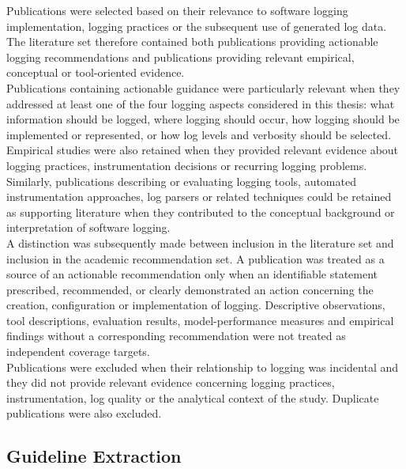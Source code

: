 Publications were selected based on their relevance to software logging
implementation, logging practices or the subsequent use of generated log data.
The literature set therefore contained both publications providing actionable
logging recommendations and publications providing relevant empirical, conceptual
or tool-oriented evidence.
\\
Publications containing actionable guidance were particularly relevant when they
addressed at least one of the four logging aspects considered in this thesis:
what information should be logged, where logging should occur, how logging should
be implemented or represented, or how log levels and verbosity should be selected.
\\
Empirical studies were also retained when they provided relevant evidence about
logging practices, instrumentation decisions or recurring logging problems.
Similarly, publications describing or evaluating logging tools, automated
instrumentation approaches, log parsers or related techniques could be retained as
supporting literature when they contributed to the conceptual background or
interpretation of software logging.
\\
A distinction was subsequently made between inclusion in the literature set and
inclusion in the academic recommendation set. A publication was treated as a source
of an actionable recommendation only when an identifiable statement prescribed,
recommended, or clearly demonstrated an action concerning the creation,
configuration or implementation of logging. Descriptive observations, tool
descriptions, evaluation results, model-performance measures and empirical findings
without a corresponding recommendation were not treated as independent coverage
targets.
\\
Publications were excluded when their relationship to logging was incidental and
they did not provide relevant evidence concerning logging practices,
instrumentation, log quality or the analytical context of the study. Duplicate
publications were also excluded.

\subsection{Guideline Extraction}

